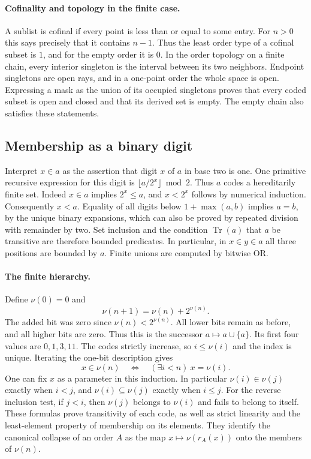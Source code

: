 \paragraph{Cofinality and topology in the finite case.}
A sublist is cofinal if every point is less than or equal to some entry.
For $n>0$ this says precisely that it contains $n-1$. Thus the least
order type of a cofinal subset is $1$, and for the empty order it is $0$.
In the order topology on a finite chain, every interior singleton is
the interval between its two neighbors. Endpoint singletons are open
rays, and in a one-point order the whole space is open. Expressing a
mask as the union of its occupied singletons proves that every coded
subset is open and closed and that its derived set is empty. The empty
chain also satisfies these statements.

\subsection{Membership as a binary digit}

Interpret $x\in a$ as the assertion that digit $x$ of $a$ in base two
is one. One primitive recursive expression for this digit is
$\lfloor a/2^x\rfloor\bmod 2$. Thus $a$ codes a hereditarily finite set.
Indeed $x\in a$ implies $2^x\le a$, and $x<2^x$ follows by numerical
induction. Consequently $x<a$. Equality of all digits below
$1+\max(a,b)$ implies $a=b$, by the unique binary expansions, which can
also be proved by repeated division with remainder by two. Set inclusion
and the condition $\operatorname{Tr}(a)$ that $a$ be transitive are
therefore bounded predicates. In particular, in $x\in y\in a$ all three
positions are bounded by $a$. Finite unions are computed by bitwise OR.

\paragraph{The finite hierarchy.}
Define $\nu(0)=0$ and
\[
                  \nu(n+1)=\nu(n)+2^{\nu(n)}.
\]
The added bit was zero since $\nu(n)<2^{\nu(n)}$. All lower bits
remain as before, and all higher bits are zero. Thus this is the
successor $a\mapsto a\cup\{a\}$. Its first four values are $0,1,3,11$.
The codes strictly increase, so $i\le\nu(i)$ and the index is unique.
Iterating the one-bit description gives
\[
        x\in\nu(n)\quad\Longleftrightarrow\quad
                     (\exists i<n)\ x=\nu(i).
\]
One can fix $x$ as a parameter in this induction. In particular
$\nu(i)\in\nu(j)$ exactly when $i<j$, and
$\nu(i)\subseteq\nu(j)$ exactly when $i\le j$. For the reverse
inclusion test, if $j<i$, then $\nu(j)$ belongs to $\nu(i)$ and fails
to belong to itself. These formulas prove transitivity of each code,
as well as strict linearity and the least-element property of
membership on its elements. They identify the canonical collapse of an
order $A$ as the map $x\mapsto\nu(r_A(x))$ onto the members of
$\nu(n)$.

